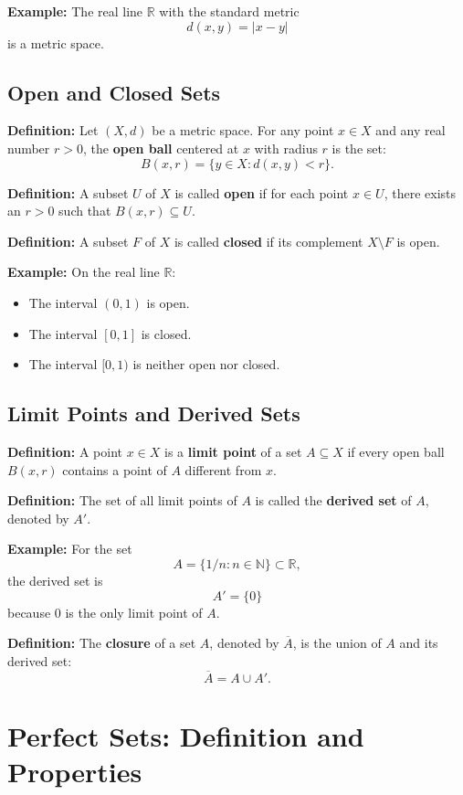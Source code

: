 \documentclass{article}
\begin{document}
\textbf{Example:} The real line $\mathbb{R}$ with the standard metric 
\[
d(x,y) = |x-y|
\]
is a metric space.

\subsection{Open and Closed Sets}

\textbf{Definition:} Let $(X,d)$ be a metric space. For any point $x \in X$ and any real number $r > 0$, the \textbf{open ball} centered at $x$ with radius $r$ is the set:
\[
B(x,r) = \{y \in X : d(x,y) < r\}.
\]

\textbf{Definition:} A subset $U$ of $X$ is called \textbf{open} if for each point $x \in U$, there exists an $r > 0$ such that $B(x,r) \subseteq U$.

\textbf{Definition:} A subset $F$ of $X$ is called \textbf{closed} if its complement $X \setminus F$ is open.

\textbf{Example:} On the real line $\mathbb{R}$:
\begin{itemize}
    \item The interval $(0,1)$ is open.
    \item The interval $[0,1]$ is closed.
    \item The interval $[0,1)$ is neither open nor closed.
\end{itemize}

\subsection{Limit Points and Derived Sets}

\textbf{Definition:} A point $x \in X$ is a \textbf{limit point} of a set $A \subseteq X$ if every open ball $B(x,r)$ contains a point of $A$ different from $x$.

\textbf{Definition:} The set of all limit points of $A$ is called the \textbf{derived set} of $A$, denoted by $A'$.

\textbf{Example:} For the set 
\[
A = \{1/n : n \in \mathbb{N}\} \subset \mathbb{R},
\]
the derived set is 
\[
A' = \{0\}
\]
because 0 is the only limit point of $A$.

\textbf{Definition:} The \textbf{closure} of a set $A$, denoted by $\overline{A}$, is the union of $A$ and its derived set:
\[
\overline{A} = A \cup A'.
\]

\section{Perfect Sets: Definition and Properties}
\end{document}
